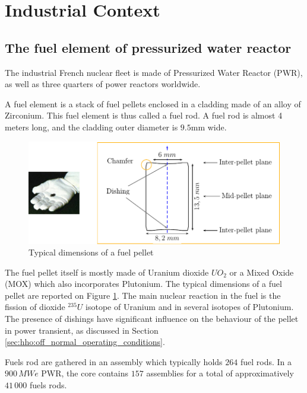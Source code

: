 \section{Industrial Context}

\subsection{The fuel element of pressurized water reactor}

The industrial French nuclear fleet is made of Pressurized Water Reactor
(PWR), as well as three quarters of power reactors worldwide.

A fuel element is a stack of fuel pellets enclosed in a cladding made of
an alloy of Zirconium. This fuel element is thus called a fuel rod. A
fuel rod is almost 4 meters long, and the cladding outer diameter is
$9.5$mm wide.


\begin{figure}[H]
  \centering
  \includegraphics[width=10.cm]{../chapter_000_introduction/figures/FuelPellet.pdf}
  \caption{Typical dimensions of a fuel pellet}
  \label{fig:hho:fuel_pellet}
\end{figure}

The fuel pellet itself is mostly made of Uranium dioxide \(UO_{2}\) or a
Mixed Oxide (MOX) which also incorporates Plutonium. The typical
dimensions of a fuel pellet are reported on Figure \ref{fig:hho:fuel_pellet}.
The main nuclear reaction in the fuel is the fission of dioxide
\(\mbox{}^{235}U\) isotope of Uranium and in several isotopes
of Plutonium. The presence of dishings have significant influence on the
behaviour of the pellet in power transient, as discussed in Section
\ref{sec:hho:off_normal_operating_conditions}.

Fuels rod are gathered in an assembly which typically holds \(264\) fuel
rods. In a \(900\,MWe\) PWR, the core contains \(157\) assemblies for a
total of approximatively \(41\,000\) fuels rods.

